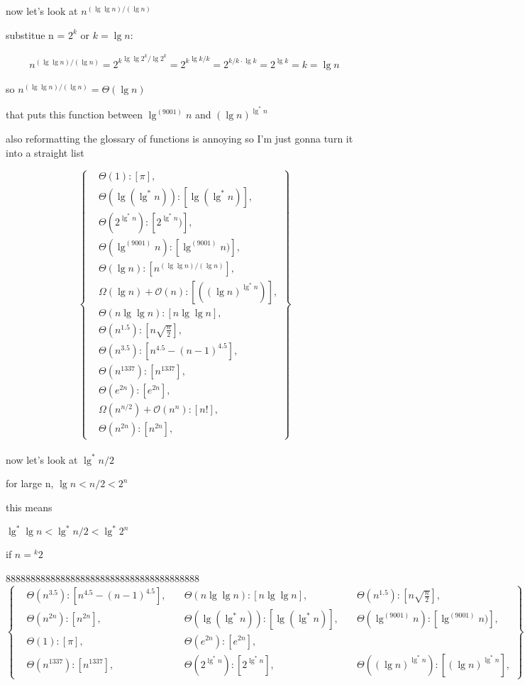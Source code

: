 \documentclass[11pt,fleqn]{article}
\theoremstyle{definition}
\theoremstyle{remark}
\begin{document}
now let's look at $n^{({\lg \lg n})/({\lg n})}$

substitue n = $2^k$ or $k = \lg n$:

\begin{align*}
n^{({\lg \lg n})/({\lg n})} =
{2^k}^{{\lg \lg {2^k}} / \lg {2^k}}=
{2^k}^{{\lg k} / k} = 
2^{{k/k} \cdot \lg k} = 
2^{\lg k} =
k =
\lg n
\end{align*}

so $n^{({\lg \lg n})/({\lg n})} = \Theta(\lg n)$

that puts this function between $\lg^{(9001)} n$ and ${(\lg n)}^{\lg^*{n}}$

also reformatting the glossary of functions is annoying so I'm just gonna turn
it into a straight list


\[
\left\{
\begin{aligned}
& \Theta(1): [\pi],\\
& \Theta(\lg(\lg^*n)): [\lg(\lg^*n)],\\
& \Theta(2^{\lg^*n}): [2^{\lg^*n})],\\
& \Theta(\lg^{(9001)} n): [\lg^{(9001)} n)],\\
& \Theta(\lg n): [n^{({\lg \lg n})/({\lg n})}],\\
& \Omega(\lg n) + \mathcal{O}(n): [({(\lg n)}^{\lg^*{n}})],\\
& \Theta(n\lg \lg n): [n\lg \lg n],\\
& \Theta(n^{1.5}): [n\sqrt{\frac{n}{2}}],\\
& \Theta(n^{3.5}): [n^{4.5} - (n - 1)^{4.5}],\\ 
& \Theta(n^{1337}): [n^{1337}],\\
& \Theta(e^{2n}): [e^{2n}],\\
& \Omega(n^{n/2}) + \mathcal{O}(n^n): [n!],\\
& \Theta(n^{2n}): [n^{2n}],
\end{aligned}
\right\}
\]\\

now let's look at $\lg^*{n/2}$

for large n, $\lg n < n/2 < 2^n$

this means

$\lg^* \lg n < \lg^* n/2 < \lg^* 2^n$

if $n = {}^k 2$

888888888888888888888888888888888888888
\[
\left\{
\begin{aligned}
& \Theta(n^{3.5}): [n^{4.5} - (n - 1)^{4.5}], 
& \quad \Theta(n \lg \lg n): [n \lg \lg n],
& \quad \Theta(n^{1.5}): [n\sqrt{\frac{n}{2}}],\\
& \Theta(n^{2n}): [n^{2n}],
& \quad \Theta(\lg(\lg^*n)): [\lg(\lg^*n)],
& \quad \Theta(\lg^{(9001)} n): [\lg^{(9001)} n)],\\
& \Theta(1): [\pi],
& \quad \Theta(e^{2n}): [e^{2n}],\\
& \Theta(n^{1337}): [n^{1337}],
& \quad \Theta(2^{\lg^*{n}}): [2^{\lg^*{n}}],
& \quad \Theta({(\lg n)}^{\lg^*{n}}): [{(\lg n)}^{\lg^*{n}}],
\end{aligned}
\right\}
\]\\
\end{document}
